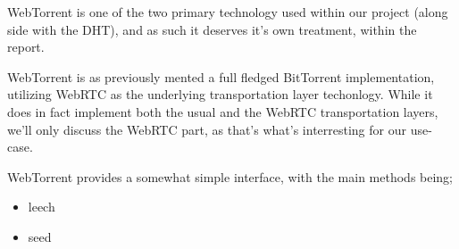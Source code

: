 WebTorrent is one of the two primary technology used within our project (along 
side with the DHT), and as such it deserves it's own treatment, within the 
report.

WebTorrent is as previously mented a full fledged BitTorrent implementation, 
utilizing WebRTC as the underlying transportation layer techonlogy. While it 
does in fact implement both the usual and the WebRTC transportation layers,
we'll only discuss the WebRTC part, as that's what's interresting for our
use-case.

WebTorrent provides a somewhat simple interface, with the main methods being;
\begin{itemize}
\item leech
\item seed
\end{itemize}


